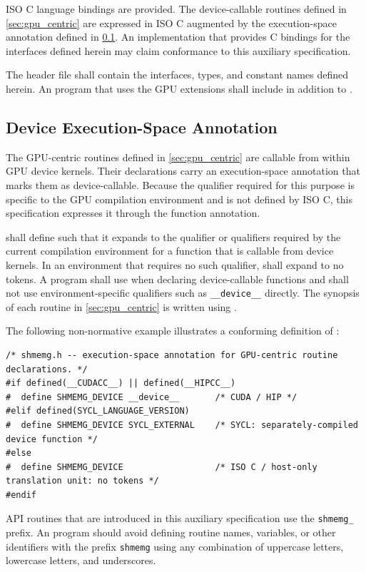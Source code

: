 
ISO C language bindings are provided. The device-callable routines defined in
\cref{sec:gpu_centric} are expressed in ISO C augmented by the
 execution-space annotation defined in
\cref{subsec:shmemg_device}. An implementation that provides C bindings for the
interfaces defined herein may claim conformance to this auxiliary specification.

The header file  shall contain the interfaces, types, and
constant names defined herein. An \openshmem program that uses the GPU extensions
shall include  in addition to .

\subsection{Device Execution-Space Annotation}\label{subsec:shmemg_device}

The GPU-centric routines defined in \cref{sec:gpu_centric} are callable from
within \ac{GPU} device kernels. Their declarations carry an execution-space
annotation that marks them as device-callable. Because the qualifier required for
this purpose is specific to the \ac{GPU} compilation environment and is not
defined by ISO C, this specification expresses it through the
 function annotation.

 shall define  such that it expands to the
qualifier or qualifiers required by the current compilation environment for a
function that is callable from device kernels. In an environment that requires no
such qualifier,  shall expand to no tokens. A program shall
use  when declaring device-callable functions and shall not
use environment-specific qualifiers such as \texttt{\_\_device\_\_} directly. The
synopsis of each routine in \cref{sec:gpu_centric} is written using
.

The following non-normative example illustrates a conforming definition of
:

\begin{lstlisting}[style=SourceListingsDefault]
/* shmemg.h -- execution-space annotation for GPU-centric routine declarations. */
#if defined(__CUDACC__) || defined(__HIPCC__)
#  define SHMEMG_DEVICE __device__       /* CUDA / HIP */
#elif defined(SYCL_LANGUAGE_VERSION)
#  define SHMEMG_DEVICE SYCL_EXTERNAL    /* SYCL: separately-compiled device function */
#else
#  define SHMEMG_DEVICE                  /* ISO C / host-only translation unit: no tokens */
#endif
\end{lstlisting}

API routines that are introduced in this auxiliary specification
use the \texttt{shmemg\_} prefix. An \openshmem program should
avoid defining routine names, variables, or other identifiers with the prefix
\texttt{shmemg} using any combination of uppercase letters, lowercase letters,
and underscores.

